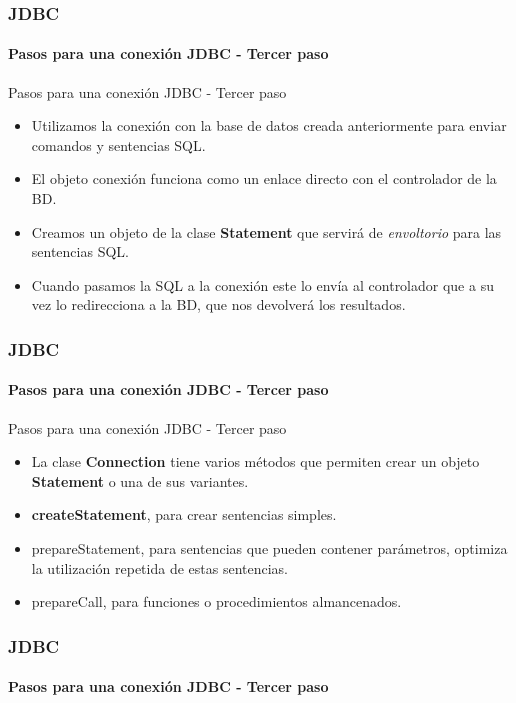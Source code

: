 \documentclass{beamer}
\begin{document}
	\begin{frame}
		\frametitle{JDBC}
		\framesubtitle{Pasos para una conexi\'on JDBC - Tercer paso}

        \begin{exampleblock}{Pasos para una conexi\'on JDBC - Tercer paso}
		    \begin{itemize}
		        \item Utilizamos la conexi\'on con la base de datos creada anteriormente para enviar comandos y sentencias SQL.
		        \item El objeto conexi\'on funciona como un enlace directo con el controlador de la BD.
		        \item Creamos un objeto de la clase \textbf{Statement} que servir\'a de \emph{envoltorio} para las sentencias SQL.
		        \item Cuando pasamos la SQL a la conexi\'on este lo env\'ia al controlador que a su vez lo redirecciona a la BD, que nos devolver\'a los resultados.
		    \end{itemize}
		    \end{exampleblock}
	\end{frame}

	\begin{frame}
		\frametitle{JDBC}
		\framesubtitle{Pasos para una conexi\'on JDBC - Tercer paso}

        \begin{exampleblock}{Pasos para una conexi\'on JDBC - Tercer paso}
		    \begin{itemize}
		        \item La clase \textbf{Connection} tiene varios m\'etodos que permiten crear un objeto \textbf{Statement} o una de sus variantes.
		        \item \textbf{createStatement}, para crear sentencias simples.
		        \item prepareStatement, para sentencias que pueden contener par\'ametros, optimiza la utilizaci\'on repetida de estas sentencias.
		        \item prepareCall, para funciones o procedimientos almancenados.
		    \end{itemize}
		    \end{exampleblock}
	\end{frame}

    \begin{frame}
		\frametitle{JDBC}
		\framesubtitle{Pasos para una conexi\'on JDBC - Tercer paso}

        
	\end{frame}
\end{document}
